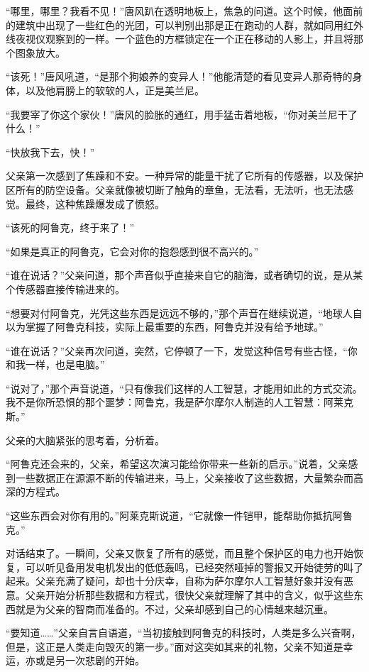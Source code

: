 “哪里，哪里？我看不见！”唐风趴在透明地板上，焦急的问道。这个时候，他面前的建筑中出现了一些红色的光团，可以判别出那是正在跑动的人群，就如同用红外线夜视仪观察到的一样。一个蓝色的方框锁定在一个正在移动的人影上，并且将那个图象放大。

“该死！”唐风吼道，“是那个狗娘养的变异人！”他能清楚的看见变异人那奇特的身体，以及他肩膀上的软软的人，正是美兰尼。

“我要宰了你这个家伙！”唐风的脸胀的通红，用手猛击着地板，“你对美兰尼干了什么！”

“快放我下去，快！”

父亲第一次感到了焦躁和不安。一种异常的能量干扰了它所有的传感器，以及保护区所有的防空设备。父亲就像被切断了触角的章鱼，无法看，无法听，也无法感觉。最终，这种焦躁爆发成了愤怒。

“该死的阿鲁克，终于来了！”

“如果是真正的阿鲁克，它会对你的抱怨感到很不高兴的。”

“谁在说话？”父亲问道，那个声音似乎直接来自它的脑海，或者确切的说，是从某个传感器直接传输进来的。

“想要对付阿鲁克，光凭这些东西是远远不够的，”那个声音在继续说道，“地球人自以为掌握了阿鲁克科技，实际上最重要的东西，阿鲁克并没有给予地球。”

“谁在说话？”父亲再次问道，突然，它停顿了一下，发觉这种信号有些古怪，“你和我一样，也是电脑。”

“说对了，”那个声音说道，“只有像我们这样的人工智慧，才能用如此的方式交流。我不是你所恐惧的那个噩梦：阿鲁克，我是萨尔摩尔人制造的人工智慧：阿莱克斯。”

父亲的大脑紧张的思考着，分析着。

“阿鲁克还会来的，父亲，希望这次演习能给你带来一些新的启示。”说着，父亲感到一些数据正在源源不断的传输进来，马上，父亲接收了这些数据，大量繁杂而高深的方程式。

“这些东西会对你有用的。”阿莱克斯说道，“它就像一件铠甲，能帮助你抵抗阿鲁克。”

对话结束了。一瞬间，父亲又恢复了所有的感觉，而且整个保护区的电力也开始恢复，可以听见备用发电机发出的低低轰鸣，已经突然哑掉的警报又开始徒劳的叫了起来。父亲充满了疑问，却也十分庆幸，自称为萨尔摩尔人工智慧好象并没有恶意。父亲开始分析那些数据和方程式，很快父亲就理解了其中的含义，似乎这些东西就是为父亲的智商而准备的。不过，父亲却感到自己的心情越来越沉重。

“要知道……”父亲自言自语道，“当初接触到阿鲁克的科技时，人类是多么兴奋啊，但是，这正是人类走向毁灭的第一步。”面对这突如其来的礼物，父亲不知道是幸运，亦或是另一次悲剧的开始。

